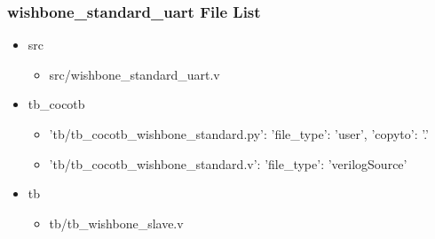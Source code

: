 \subsubsection{wishbone\_standard\_uart File List}
\begin{itemize}
\item src
	\begin{itemize}
	\item src/wishbone\_standard\_uart.v
	\end{itemize}
\item tb\_cocotb
	\begin{itemize}
	\item {'tb/tb\_cocotb\_wishbone\_standard.py': {'file\_type': 'user', 'copyto': '.'}}
	\item {'tb/tb\_cocotb\_wishbone\_standard.v': {'file\_type': 'verilogSource'}}
	\end{itemize}
\item tb
	\begin{itemize}
	\item tb/tb\_wishbone\_slave.v
	\end{itemize}
\end{itemize}
